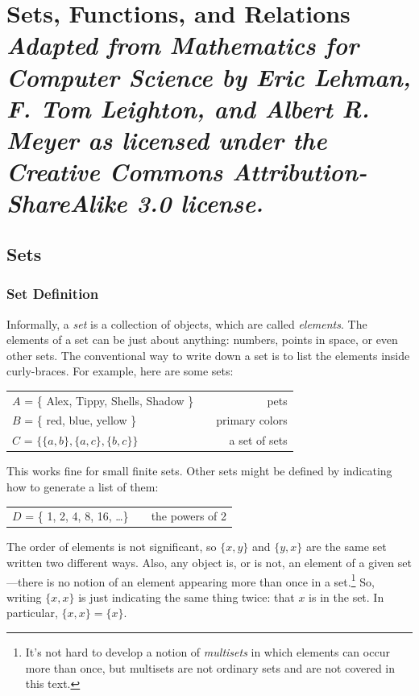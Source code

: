 \documentclass[11pt,oneside]{book}
\theoremstyle{definition}
\begin{document}
\chapter[Sets, Functions, and Relations]{Sets, Functions, and Relations\\[0.5ex]
\normalsize\normalfont\textit{
    Adapted from \emph{Mathematics for Computer Science} by Eric Lehman, F. Tom Leighton, and Albert R. Meyer as licensed under the Creative Commons Attribution-ShareAlike 3.0 license.
}}\label{ch:Sets}


\section{Sets}\label{sec:Sets}
\subsection{Set Definition}
Informally, a \emph{set} is a collection of objects, which are called \emph{elements}.
The elements of a set can be just about anything: numbers, points in space, or even other sets.
The conventional way to write down a set is to list the elements inside curly-braces.
For example, here are some sets:

\begin{center}\begin{tabular}{lcr}
    $A$ = \{ Alex, Tippy, Shells, Shadow \} && pets \\
    $B$ = \{ red, blue, yellow \} && primary colors \\
    $C$ = $\{ \{ a, b \}, \{ a, c \}, \{ b, c \} \}$ && a set of sets
\end{tabular}\end{center}

This works fine for small finite sets.
Other sets might be defined by indicating how to generate a list of them:

\begin{center}\begin{tabular}{lcr}
    $D$ = \{ 1, 2, 4, 8, 16, \dots \} && the powers of 2
\end{tabular}\end{center}

The order of elements is not significant, so $\{ x, y \}$ and $\{ y, x \}$ are the same set written two different ways.
Also, any object is, or is not, an element of a given set---there is no notion of an element appearing more than once in a set.\footnote{
    It's not hard to develop a notion of \emph{multisets} in which elements can occur more than once, but multisets are not ordinary sets and are not covered in this text.
}
So, writing $\{ x, x \}$ is just indicating the same thing twice: that $x$ is in the set.
In particular, $\{ x, x \} = \{ x \}$.
\end{document}
